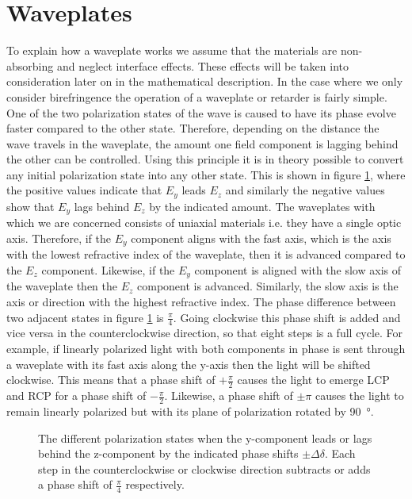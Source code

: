 \section{Waveplates}
\label{sec:waveplates}
To explain how a waveplate works we assume that the materials are non-absorbing and neglect interface effects. These effects will be taken into consideration later on in the mathematical description. In the case where we only consider birefringence the operation of a waveplate or retarder is fairly simple. One of the two polarization states of the wave is caused to have its phase evolve faster compared to the other state. Therefore, depending on the distance the wave travels in the waveplate, the amount one field component is lagging behind the other can be controlled. Using this principle it is in theory possible to convert any initial polarization state into any other state. This is shown in figure \ref{fig:waveplate_conversions}, where the positive values indicate that $E_y$ leads $E_z$ and similarly the negative values show that $E_y$ lags behind $E_z$ by the indicated amount. The waveplates with which we are concerned consists of uniaxial materials i.e. they have a single optic axis. Therefore, if the $E_y$ component aligns with the fast axis, which is the axis with the lowest refractive index of the waveplate, then it is advanced compared to the $E_z$ component. Likewise, if the $E_y$ component is aligned with the slow axis of the waveplate then the $E_z$ component is advanced. Similarly, the slow axis is the axis or direction with the highest refractive index. The phase difference between two adjacent states in figure \ref{fig:waveplate_conversions} is $\frac{\pi}{4}$. Going clockwise this phase shift is added and vice versa in the counterclockwise direction, so that eight steps is a full cycle. For example, if linearly polarized light with both components in phase is sent through a waveplate with its fast axis along the y-axis then the light will be shifted clockwise. This means that a phase shift of $+\frac{\pi}{2}$ causes the light to emerge LCP and RCP for a phase shift of $-\frac{\pi}{2}$. Likewise, a phase shift of $\pm \pi$ causes the light to remain linearly polarized but with its plane of polarization rotated by \SI{90}{\degree}.

\newpage

\begin{figure}[h]
    \centering
    
    \caption{The different polarization states when the y-component leads or lags behind the z-component by the indicated phase shifts $\pm \Delta \delta$. Each step in the counterclockwise or clockwise direction subtracts or adds a phase shift of $\frac{\pi}{4}$ respectively.}
    \label{fig:waveplate_conversions}
\end{figure}

